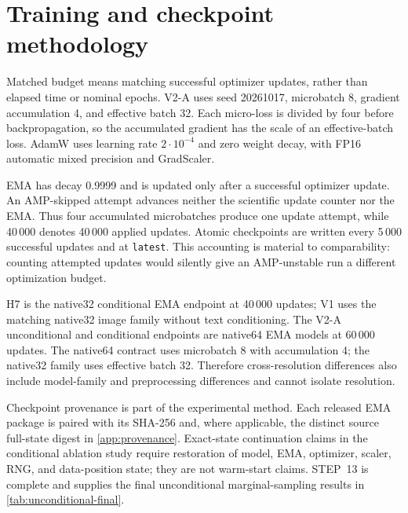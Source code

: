 \section{Training and checkpoint methodology}\label{sec:training}
Matched budget means matching successful optimizer updates, rather than elapsed time or nominal epochs. V2-A uses seed 20261017, microbatch 8, gradient accumulation 4, and effective batch 32. Each micro-loss is divided by four before backpropagation, so the accumulated gradient has the scale of an effective-batch loss. AdamW uses learning rate $2\cdot10^{-4}$ and zero weight decay, with FP16 automatic mixed precision and GradScaler.

EMA has decay 0.9999 and is updated only after a successful optimizer update. An AMP-skipped attempt advances neither the scientific update counter nor the EMA. Thus four accumulated microbatches produce one update attempt, while 40\,000 denotes 40\,000 applied updates. Atomic checkpoints are written every 5\,000 successful updates and at \texttt{latest}. This accounting is material to comparability: counting attempted updates would silently give an AMP-unstable run a different optimization budget.

H7 is the native32 conditional EMA endpoint at 40\,000 updates; V1 uses the matching native32 image family without text conditioning. The V2-A unconditional and conditional endpoints are native64 EMA models at 60\,000 updates. The native64 contract uses microbatch 8 with accumulation 4; the native32 family uses effective batch 32. Therefore cross-resolution differences also include model-family and preprocessing differences and cannot isolate resolution.

Checkpoint provenance is part of the experimental method. Each released EMA package is paired with its SHA-256 and, where applicable, the distinct source full-state digest in \cref{app:provenance}. Exact-state continuation claims in the conditional ablation study require restoration of model, EMA, optimizer, scaler, RNG, and data-position state; they are not warm-start claims. STEP~13 is complete and supplies the final unconditional marginal-sampling results in \cref{tab:unconditional-final}.
